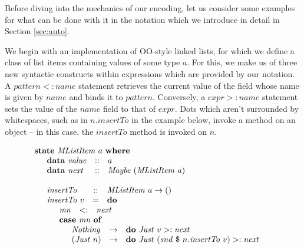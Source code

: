 \documentclass[runningheads,a4paper]{llncs}
\begin{document}
Before diving into the mechanics of our encoding, let us consider some examples for what can be done with it in the notation which we introduce in detail in Section \ref{sec:auto}. 

We begin with an implementation of OO-style linked lists, for which we define a class of list items containing values of some type $a$. For this, we make us of three new syntactic constructs within expressions which are provided by our notation. A $\mathit{pattern} <: \mathit{name}$ statement retrieves the current value of the field whose name is given by $\mathit{name}$ and binds it to $\mathit{pattern}$. Conversely, a $\mathit{expr} >: \mathit{name}$ statement sets the value of the $\mathit{name}$ field to that of $\mathit{expr}$. Dots which aren't surrounded by whitespaces, such as in $n.\mathit{insertTo}$ in the example below, invoke a method on an object -- in this case, the $\mathit{insertTo}$ method is invoked on $n$.

\begin{displaymath}
\begin{array}{l}
\mathbf{state}~\mathit{MListItem}~a~\mathbf{where} \\
\quad \begin{array}{lcl}
\mathbf{data}~\mathit{value} & :: & a \\
\mathbf{data}~\mathit{next}  & :: & \mathit{Maybe}~(\mathit{MListItem}~a)
\end{array}\\\\
\quad \begin{array}{lcl}
\mathit{insertTo} & :: & \mathit{MListItem}~a \to ()\\
\mathit{insertTo}~v & = & \mathbf{do} \\
\multicolumn{3}{l}{\quad \begin{array}{lcl}
\mathit{mn} & <: & \mathit{next} \\
\multicolumn{3}{l}{\mathbf{case}~\mathit{mn}~\mathbf{of}} \\
\multicolumn{3}{l}{\quad \begin{array}{lcl}
\mathit{Nothing} & \to & \mathbf{do}~\mathit{Just}~v >: \mathit{next} \\
(\mathit{Just}~n) & \to & \mathbf{do}~\mathit{Just}~(\mathit{snd}~\$~n.\mathit{insertTo}~v) >: \mathit{next}
\end{array}}
\end{array}}
\end{array}
\end{array}
\end{displaymath}
\end{document}
